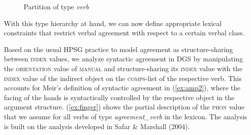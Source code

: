 \documentclass[11pt,a4paper,fleqn]{article}
\begin{document}
\begin{figure}[htbp]
\label{ex:signature}
\resizebox{\linewidth}{!}{
\resizebox{\textheight}{!}
{\Tree
[.\textit{verb}
	\textit{plain\_verb}
	[.\textit{agr\_verb}
		[.\textit{reg\_agr\_verb}
		\textit{reg\_agr\_trans\_verb}
		\textit{reg\_agr\_ditrans\_verb}
		]
		[.\textit{back\_agr\_verb}
		\textit{back\_agr\_trans\_verb}
		\textit{back\_agr\_ditrans\_verb}
		]
	]
]}}
\caption{Partition of type \textit{verb}}\label{signature-ref}
\end{figure}





With this type hierarchy at hand, we can now define appropriate lexical constraints that restrict verbal agreement with respect to a certain verbal class. 

Based on the usual HPSG practice to model agreement as structure-sharing between \textsc{index} values, we analyze syntactic agreement in DGS by manipulating the \textsc{orientation} value of \textsc{manual} and structure-sharing its \textsc{index} value with the \textsc{index} value of the indirect object on the \textsc{comps}-list of the respective verb. This accounts for Meir’s definition of syntactic agreement in (\ref{ex:amp2}), where the facing of the hands is syntactically controlled by the respective object in the argument structure. (\ref{ex:finger}) shows the partial description of the \textsc{phon} value that we assume for all verbs of type \textit{agreement\_verb} in the lexicon. The analysis is built on the analysis developed in Safar  \&  Marshall (2004).

\begin{exe}
\ex  \label{ex:finger}
\end{exe}
\end{document}
